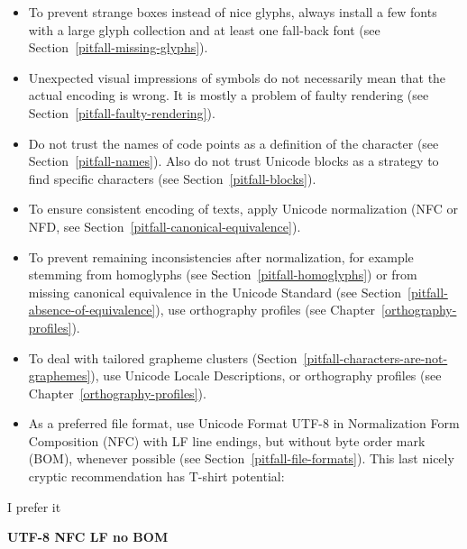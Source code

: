 \begin{itemize}
   \item To prevent strange boxes instead of nice glyphs, always install a few
         fonts with a large glyph collection and at least one fall-back font
         (see Section~\ref{pitfall-missing-glyphs}).
   \item Unexpected visual impressions of symbols do not necessarily mean that
         the actual encoding is wrong. It is mostly a problem of faulty
         rendering (see Section~\ref{pitfall-faulty-rendering}).
   \item Do not trust the names of code points as a definition of the character
         (see Section~\ref{pitfall-names}). Also do not trust Unicode blocks as
         a strategy to find specific characters (see
         Section~\ref{pitfall-blocks}).
   \item To ensure consistent encoding of texts, apply Unicode normalization
         (NFC or NFD, see Section~\ref{pitfall-canonical-equivalence}).
   \item To prevent remaining inconsistencies after normalization, for example 
         stemming from homoglyphs (see Section~\ref{pitfall-homoglyphs}) 
         or from missing canonical equivalence in the Unicode Standard
         (see Section~\ref{pitfall-absence-of-equivalence}), 
         use orthography profiles (see Chapter~\ref{orthography-profiles}).
   \item To deal with tailored grapheme clusters
         (Section~\ref{pitfall-characters-are-not-graphemes}), use Unicode Locale 
         Descriptions, or orthography profiles 
         (see Chapter~\ref{orthography-profiles}).
   \item As a preferred file format, use Unicode Format UTF-8 in 
         Normalization Form Composition (NFC) with LF line endings, 
         but without byte order mark (BOM), whenever possible (see 
         Section~\ref{pitfall-file-formats}). This last nicely cryptic 
         recommendation has T-shirt potential:
  
\end{itemize}

\begin{center}
  I prefer it
  
  \textbf{UTF-8 NFC LF no BOM}
\end{center}



